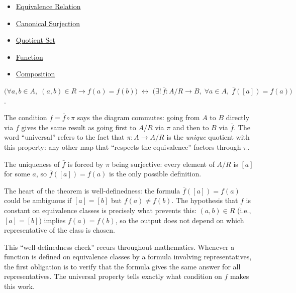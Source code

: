 \begin{dependencies}
\begin{itemize}
  \item \hyperref[def:equivalence-relation]{Equivalence Relation}
  \item \hyperref[def:canonical-surj]{Canonical Surjection}
  \item \hyperref[def:quotient-set]{Quotient Set}
  \item \hyperref[def:function]{Function}
  \item \hyperref[def:composition]{Composition}
\end{itemize}
\end{dependencies}

\begin{remark*}
$\bigl(\forall a,b \in A,\; (a,b)\in R \to f(a) = f(b)\bigr) \;\leftrightarrow\; \bigl(\exists!\, \bar{f} : A/R \to B,\; \forall a \in A,\; \bar{f}([a]) = f(a)\bigr)$.
\end{remark*}

\begin{remark*}
The condition $f = \bar{f} \circ \pi$ says the diagram commutes: going
from $A$ to $B$ directly via $f$ gives the same result as going first to
$A/R$ via $\pi$ and then to $B$ via $\bar{f}$. The word ``universal''
refers to the fact that $\pi : A \to A/R$ is the \emph{unique} quotient with
this property: any other map that ``respects the equivalence'' factors through
$\pi$.

The uniqueness of $\bar{f}$ is forced by $\pi$ being surjective: every
element of $A/R$ is $[a]$ for some $a$, so $\bar{f}([a]) = f(a)$ is the
only possible definition.
\end{remark*}

\begin{remark*}
The heart of the theorem is well-definedness: the formula $\bar{f}([a]) =
f(a)$ could be ambiguous if $[a] = [b]$ but $f(a) \neq f(b)$. The hypothesis
that $f$ is constant on equivalence classes is precisely what prevents this:
$(a,b) \in R$ (i.e., $[a] = [b]$) implies $f(a) = f(b)$, so the output
does not depend on which representative of the class is chosen.

This ``well-definedness check'' recurs throughout mathematics. Whenever a
function is defined on equivalence classes by a formula involving
representatives, the first obligation is to verify that the formula gives
the same answer for all representatives. The universal property tells exactly
what condition on $f$ makes this work.
\end{remark*}

